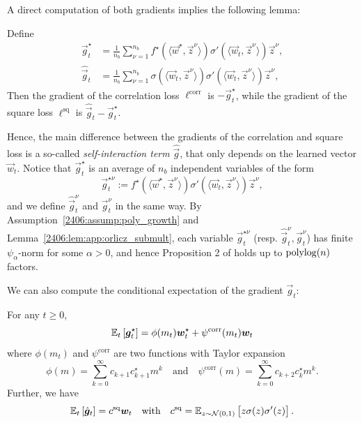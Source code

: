 A direct computation of both gradients implies the following lemma:
\begin{lemma}
Define
\begin{equation}\label{2406:eq:app:def_ghat_gstar}
    \begin{split}
    \vec{g}_t^\star &= \frac{1}{n_b} \sum_{\nu=1}^{n_b} f^\star(\langle \vec{w}^\star, \vec{z}^\nu \rangle) \sigma'(\langle \vec{w}_t, \vec{z}^\nu \rangle) \vec{z}^\nu, \\
    \hat{\vec{g}}_t &= \frac{1}{n_b} \sum_{\nu=1}^{n_b} \sigma(\langle \vec{w}_t, \vec{z}^\nu \rangle) \sigma'(\langle \vec{w}_t, \vec{z}^\nu \rangle) \vec{z}^\nu,
    \end{split}
\end{equation}
    Then the gradient of the correlation loss $\ell^{\mathrm{corr}}$ is $- \vec{g}_t^\star$, while the gradient of the square loss $\ell^{\mathrm{sq}}$ is $\hat{\vec{g}}_t - \vec{g}_t^\star$.
\end{lemma}

Hence, the main difference between the gradients of the correlation and square loss is a so-called \emph{self-interaction term} $\hat{\vec{g}}$, that only depends on the learned vector $\vec{w}_t$. Notice that $\vec{g}_t^\star$ is an average of $n_b$ independent variables of the form
\begin{equation}
    \vec{g}_t^{\star\nu} := f^\star(\langle \vec{w}^\star, \vec{z}^\nu \rangle) \sigma'(\langle \vec{w}_t, \vec{z}^\nu \rangle) \vec{z}^\nu,
\end{equation}
and we define $\hat{\vec{g}}_t^\nu$ and $\vec{g}_t^\nu$ in the same way. By Assumption~\ref{2406:assump:poly_growth} and Lemma~\ref{2406:lem:app:orlicz_submult}, each variable $\vec{g}_t^{\star\nu}$ (resp. $\hat{\vec{g}}_t^\nu, \vec{g}_t^\nu$) has finite $\psi_\alpha$-norm for some $\alpha > 0$, and hence Proposition 2 of \cite{dandi2023how} holds up to $\polylog(n)$ factors. 

We can also compute the conditional expectation of the gradient $\vec{g}_t$:
\begin{lemma}\label{2406:lem:app:exp_g}
    For any $t \geq 0$, 
    \begin{equation}
        \Et{\vec{g}_t^\star} = \phi(m_t) \vec{w}_t^\star +  \psi^{\mathrm{corr}}(m_t) \vec{w}_t 
    \end{equation}
    where $\phi(m_t)$ and $\psi^{\mathrm{corr}}$ are two functions with Taylor expansion
    \begin{equation}
        \phi(m) = \sum_{k=0}^\infty c_{k+1}c_{k+1}^\star m^k \quad \text{and} \quad \psi^{\mathrm{corr}}(m) = \sum_{k=0}^\infty c_{k+2}c_{k}^\star m^k.
    \end{equation}
    Further, we have
    \begin{equation}
        \Et{\hat{\vec{g}}_t} =  c^{\mathrm{sq}} \vec{w}_t \quad \text{with} \quad c^{\mathrm{sq}} = \Ec{z \sigma(z) \sigma'(z)}{z\sim \cN(0, 1)}.
    \end{equation}
\end{lemma}

